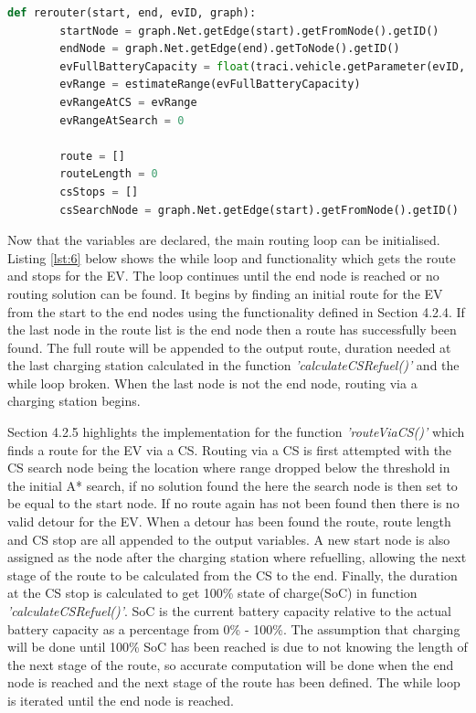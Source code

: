 \documentclass[11pt]{report}
\begin{document}
\begin{lstlisting}[language=Python, caption=Routing initialisation function variable declarations, label={lst:5}]
    def rerouter(start, end, evID, graph):
        startNode = graph.Net.getEdge(start).getFromNode().getID()
        endNode = graph.Net.getEdge(end).getToNode().getID()
        evFullBatteryCapacity = float(traci.vehicle.getParameter(evID, 'device.battery.actualBatteryCapacity'))
        evRange = estimateRange(evFullBatteryCapacity)
        evRangeAtCS = evRange
        evRangeAtSearch = 0
    
        route = []
        routeLength = 0
        csStops = []
        csSearchNode = graph.Net.getEdge(start).getFromNode().getID()
\end{lstlisting}

Now that the variables are declared, the main routing loop can be initialised. Listing \ref{lst:6} below shows the while loop and functionality which gets the route and stops for the EV. The loop continues until the end node is reached or no routing solution can be found. It begins by finding an initial route for the EV from the start to the end nodes using the functionality defined in Section 4.2.4. If the last node in the route list is the end node then a route has successfully been found. The full route will be appended to the output route, duration needed at the last charging station calculated in the function \emph{'calculateCSRefuel()'} and the while loop broken. When the last node is not the end node, routing via a charging station begins. 

Section 4.2.5 highlights the implementation for the function \emph{'routeViaCS()'} which finds a route for the EV via a CS. Routing via a CS is first attempted with the CS search node being the location where range dropped below the threshold in the initial A* search, if no solution found the here the search node is then set to be equal to the start node. If no route again has not been found then there is no valid detour for the EV. When a detour has been found the route, route length and CS stop are all appended to the output variables. A new start node is also assigned as the node after the charging station where refuelling, allowing the next stage of the route to be calculated from the CS to the end. Finally, the duration at the CS stop is calculated to get 100\% state of charge(SoC) in function \emph{'calculateCSRefuel()'}. SoC is the current battery capacity relative to the actual battery capacity as a percentage from 0\% - 100\%. The assumption that charging will be done until 100\% SoC has been reached is due to not knowing the length of the next stage of the route, so accurate computation will be done when the end node is reached and the next stage of the route has been defined. The while loop is iterated until the end node is reached.
\end{document}

